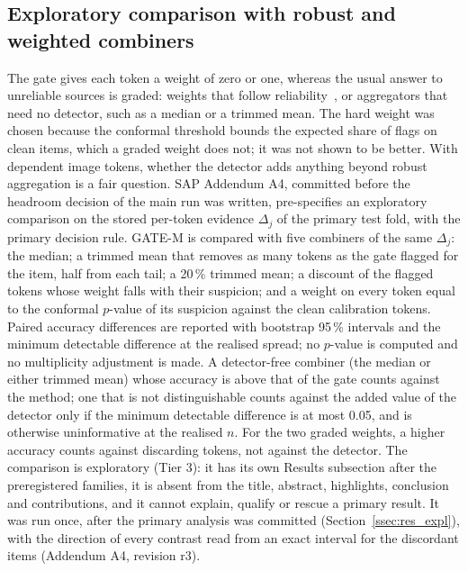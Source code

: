 \subsection{Exploratory comparison with robust and weighted combiners}\label{ssec:tier3}
The gate gives each token a weight of zero or one, whereas the usual answer to unreliable sources is graded: weights that follow
reliability~\cite{chair1986optimal,huang2025evidential}, or aggregators that need no detector, such as a median or a trimmed mean.
The hard weight was chosen because the conformal threshold bounds the expected share of flags on clean items, which a graded weight
does not; it was not shown to be better.
With dependent image tokens, whether the detector adds anything beyond robust aggregation is a fair question.
SAP Addendum A4, committed before the headroom decision of the main run was written, pre-specifies an exploratory comparison on
the stored per-token evidence $\Delta_j$ of the primary test fold, with the primary decision rule.
GATE-M is compared with five combiners of the same $\Delta_j$: the median; a trimmed mean that removes as many tokens as the gate
flagged for the item, half from each tail; a 20\,\% trimmed mean; a discount of the flagged tokens whose weight falls with their
suspicion; and a weight on every token equal to the conformal $p$-value of its suspicion against the clean calibration tokens.
Paired accuracy differences are reported with bootstrap 95\,\% intervals and the minimum detectable difference at the realised
spread; no $p$-value is computed and no multiplicity adjustment is made.
A detector-free combiner (the median or either trimmed mean) whose accuracy is above that of the gate counts against the method; one
that is not distinguishable counts against the added value of the detector only if the minimum detectable difference is at most
0.05, and is otherwise uninformative at the realised $n$.
For the two graded weights, a higher accuracy counts against discarding tokens, not against the detector.
The comparison is exploratory (Tier 3): it has its own Results subsection after the preregistered families, it is absent from the
title, abstract, highlights, conclusion and contributions, and it cannot explain, qualify or rescue a primary result.
It was run once, after the primary analysis was committed (Section~\ref{ssec:res_expl}), with the direction of every contrast read from
an exact interval for the discordant items (Addendum A4, revision r3).

